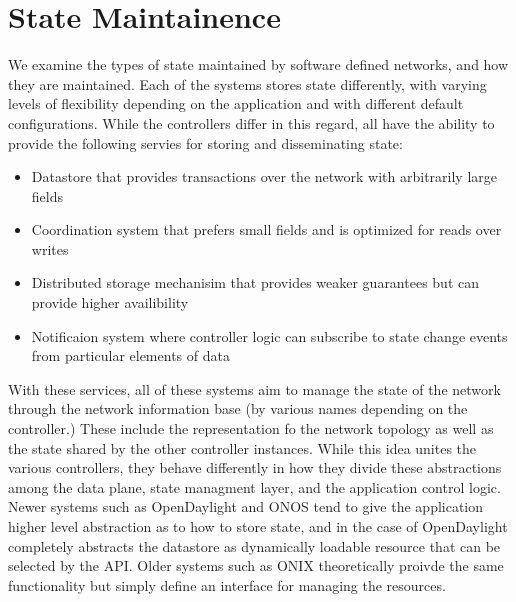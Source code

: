 \documentclass[letterpaper,twocolumn,10pt]{article}
\begin{document}




\section{State Maintainence}

We examine the types of state maintained by software defined networks, and how they are maintained. Each of the systems stores state differently, with varying levels of flexibility depending on the application and with different default configurations. While the controllers differ in this regard, all have the ability to provide the following servies for storing and disseminating state:

\begin{itemize}
\item Datastore that provides transactions over the network with arbitrarily large fields
\item Coordination system that prefers small fields and is optimized for reads over writes
\item Distributed storage mechanisim that provides weaker guarantees but can provide higher availibility
\item Notificaion system where controller logic can subscribe to state change events from particular elements of data
\end{itemize}

With these services, all of these systems aim to manage the state of the network through the network information base (by various names depending on the controller.) These include the representation fo the network topology as well as the state shared by the other controller instances. While this idea unites the various controllers, they behave differently in how they divide these abstractions among the data plane, state managment layer, and the application control
logic. Newer systems such as OpenDaylight and ONOS tend to give the application higher level abstraction as to how to store state, and in the case of OpenDaylight completely abstracts the datastore as dynamically loadable resource that can be selected by the API. Older systems such as ONIX theoretically proivde the same functionality but simply define an interface for managing the resources. 
\end{document}
